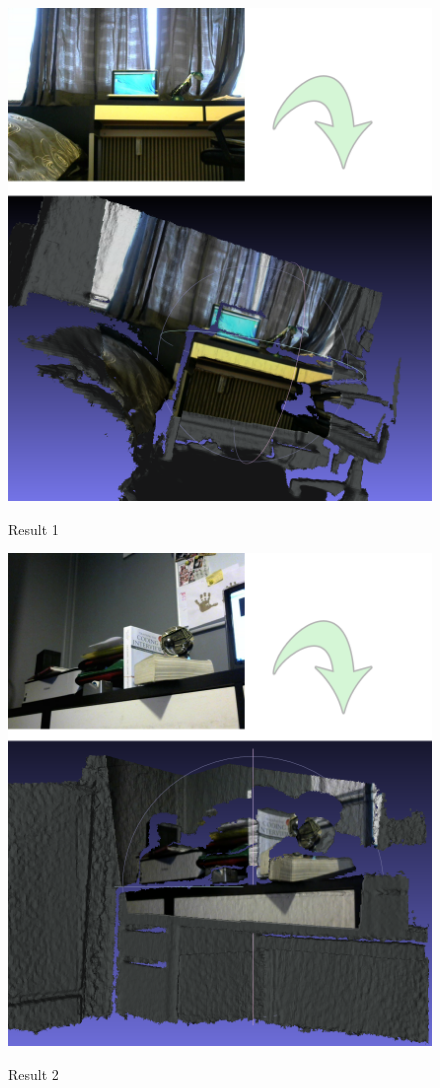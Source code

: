 \begin{figure}
\caption{Result 1}
\centering
    \includegraphics[width=1.0\textwidth]{images/result1.png}
\label{fig:result1}
\end{figure}

\begin{figure}
\caption{Result 2}
\centering
    \includegraphics[width=1.0\textwidth]{images/result2.png}
\label{fig:result2}
\end{figure}

